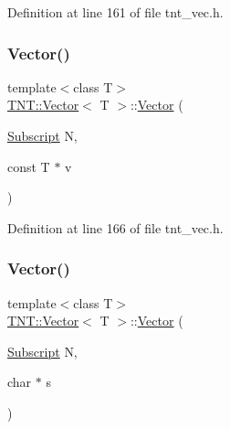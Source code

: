 Definition at line 161 of file tnt\+\_\+vec.\+h.

\mbox{\label{classTNT_1_1Vector_ac4709b0750a97e66ecd1ffbf9e45a8ea}} 
\subsubsection{\texorpdfstring{Vector()}{Vector()}\hspace{0.1cm}{\footnotesize\ttfamily [4/5]}}
{\footnotesize\ttfamily template$<$class T$>$ \\
\hyperlink{classTNT_1_1Vector}{T\+N\+T\+::\+Vector}$<$ T $>$\+::\hyperlink{classTNT_1_1Vector}{Vector} (\begin{DoxyParamCaption}\item[{\hyperlink{namespaceTNT_af22e3f1460e145c04ce4e7d701e4c1c1}{Subscript}}]{N,  }\item[{const T $\ast$}]{v }\end{DoxyParamCaption})\hspace{0.3cm}{\ttfamily [inline]}}



Definition at line 166 of file tnt\+\_\+vec.\+h.

\mbox{\label{classTNT_1_1Vector_a89ae28b74f28b6ba72fbc425937d3603}} 
\subsubsection{\texorpdfstring{Vector()}{Vector()}\hspace{0.1cm}{\footnotesize\ttfamily [5/5]}}
{\footnotesize\ttfamily template$<$class T$>$ \\
\hyperlink{classTNT_1_1Vector}{T\+N\+T\+::\+Vector}$<$ T $>$\+::\hyperlink{classTNT_1_1Vector}{Vector} (\begin{DoxyParamCaption}\item[{\hyperlink{namespaceTNT_af22e3f1460e145c04ce4e7d701e4c1c1}{Subscript}}]{N,  }\item[{char $\ast$}]{s }\end{DoxyParamCaption})\hspace{0.3cm}{\ttfamily [inline]}}



